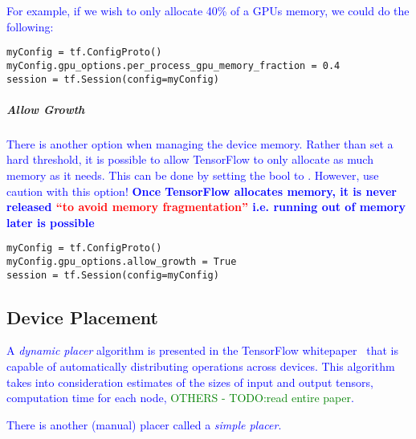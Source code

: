 \textcolor{blue}{For example, if we wish to only allocate 40\% of a GPUs memory, we could do the following:}

\begin{lstlisting}[style=pyInStyle]
myConfig = tf.ConfigProto()
myConfig.gpu_options.per_process_gpu_memory_fraction = 0.4
session = tf.Session(config=myConfig)
\end{lstlisting}


\subparagraph{Allow Growth}

\textcolor{blue}{There is another option when managing the device memory. Rather than set a hard threshold, it is possible to allow TensorFlow to only allocate as much memory as it needs. This can be done by setting the  bool to . However, use caution with this option! \textbf{Once TensorFlow allocates memory, it is never released \textcolor{red}{``to avoid memory fragmentation''} i.e. running out of memory later is possible}}

\begin{lstlisting}[style=pyInStyle]
myConfig = tf.ConfigProto()
myConfig.gpu_options.allow_growth = True
session = tf.Session(config=myConfig)
\end{lstlisting}


\subsection{Device Placement}

\textcolor{blue}{A \textit{dynamic placer} algorithm is presented in the {TensorFlow whitepaper}~\cite{abadi2016tensorflow_device_placement} that is capable of automatically distributing operations across devices. This algorithm takes into consideration  estimates of the sizes of input and output tensors, computation time for each node, \textcolor{green}{OTHERS - TODO:read entire paper}.}

\textcolor{blue}{There is another (manual) placer called a \textit{simple placer}.}



